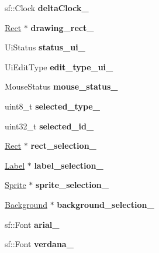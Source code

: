 \begin{DoxyCompactItemize}
sf\+::\+Clock {\bfseries delta\+Clock\+\_\+}
\item 
\mbox{\label{class_game_manager_a997508d81087c8c43a582aee19bbaf00}} 
\hyperlink{class_rect}{Rect} $\ast$ {\bfseries drawing\+\_\+rect\+\_\+}
\item 
\mbox{\label{class_game_manager_a0698b68fc4f55194a68a4e4dbd2d8c5c}} 
Ui\+Status {\bfseries status\+\_\+ui\+\_\+}
\item 
\mbox{\label{class_game_manager_a847f49a1b8ebfde618b1496dd73ac284}} 
Ui\+Edit\+Type {\bfseries edit\+\_\+type\+\_\+ui\+\_\+}
\item 
\mbox{\label{class_game_manager_a48121c2bb9a61473fc2f693d6db33bee}} 
Mouse\+Status {\bfseries mouse\+\_\+status\+\_\+}
\item 
\mbox{\label{class_game_manager_a627fdbcdd2105f8a5cea05ecc5c888d6}} 
uint8\+\_\+t {\bfseries selected\+\_\+type\+\_\+}
\item 
\mbox{\label{class_game_manager_a4c9c1a365ad3f8db30406bffa65b2a8a}} 
uint32\+\_\+t {\bfseries selected\+\_\+id\+\_\+}
\item 
\mbox{\label{class_game_manager_aa5bd354afb80e72c06c337f429cea333}} 
\hyperlink{class_rect}{Rect} $\ast$ {\bfseries rect\+\_\+selection\+\_\+}
\item 
\mbox{\label{class_game_manager_a261c6a163e135c248aed7805271b95b8}} 
\hyperlink{class_label}{Label} $\ast$ {\bfseries label\+\_\+selection\+\_\+}
\item 
\mbox{\label{class_game_manager_a003552c00376d99c1855e7d9dbff69de}} 
\hyperlink{class_sprite}{Sprite} $\ast$ {\bfseries sprite\+\_\+selection\+\_\+}
\item 
\mbox{\label{class_game_manager_af9ea4edd8eac6039bf07364f1e6d5d73}} 
\hyperlink{class_background}{Background} $\ast$ {\bfseries background\+\_\+selection\+\_\+}
\item 
\mbox{\label{class_game_manager_a1a55c05c5133d56a9a5ba9ee1b2026e8}} 
sf\+::\+Font {\bfseries arial\+\_\+}
\item 
\mbox{\label{class_game_manager_a16df94d56453c106931bf9bb6189bb66}} 
sf\+::\+Font {\bfseries verdana\+\_\+}
\end{DoxyCompactItemize}
